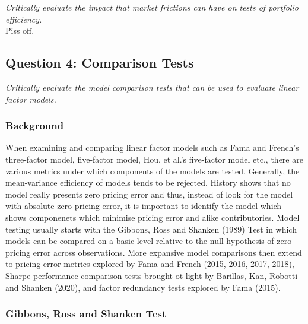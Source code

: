 \documentclass[11pt, english]{article}
\begin{document}
	\textit{Critically evaluate the impact that market frictions can have on tests of portfolio efficiency.}\\

	Piss off.

	\newpage

	\subsection{Question 4: Comparison Tests}

	\textit{Critically evaluate the model comparison tests that can be used to evaluate linear factor models.}

		\subsubsection*{Background}

        When examining and comparing linear factor models such as Fama and French's three-factor model, five-factor model, Hou, et al.'s five-factor model etc., there are various metrics under which components of the models are tested. Generally, the mean-variance efficiency of models tends to be rejected. History shows that no model really presents zero pricing error and thus, instead of look for the model with absolute zero pricing error, it is important to identify the model which shows componenets which minimise pricing error and alike contributories. Model testing usually starts with the Gibbons, Ross and Shanken (1989) Test in which models can be compared on a basic level relative to the null hypothesis of zero pricing error across observations. More expansive model comparisons then extend to pricing error metrics explored by Fama and French (2015, 2016, 2017, 2018), Sharpe performance comparison tests brought ot light by Barillas, Kan, Robotti and Shanken (2020), and factor redundancy tests explored by Fama (2015).

                \subsubsection*{Gibbons, Ross and Shanken Test}
\end{document}
